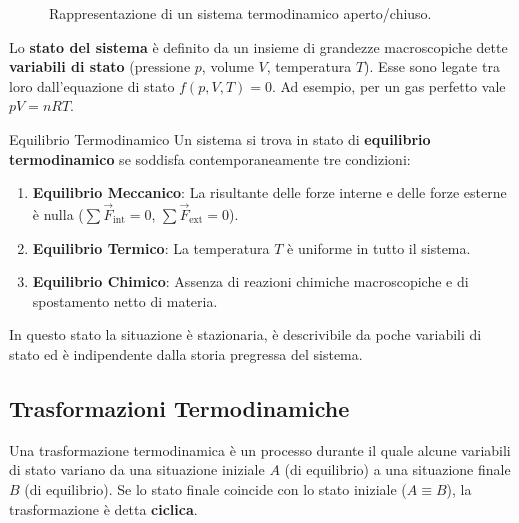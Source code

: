 \begin{figure}[ht]
\centering
{}
\caption{Rappresentazione di un sistema termodinamico aperto/chiuso.}
\end{figure}

Lo \textbf{stato del sistema} è definito da un insieme di grandezze macroscopiche dette \textbf{variabili di stato} (pressione $p$, volume $V$, temperatura $T$). Esse sono legate tra loro dall'equazione di stato $f(p, V, T) = 0$. Ad esempio, per un gas perfetto vale $p V = n R T$.

\begin{definizione}{Equilibrio Termodinamico}
Un sistema si trova in stato di \textbf{equilibrio termodinamico} se soddisfa contemporaneamente tre condizioni:
\begin{enumerate}
    \item \textbf{Equilibrio Meccanico}: La risultante delle forze interne e delle forze esterne è nulla ($\sum \vec{F}_{\text{int}} = 0$, $\sum \vec{F}_{\text{ext}} = 0$).
    \item \textbf{Equilibrio Termico}: La temperatura $T$ è uniforme in tutto il sistema.
    \item \textbf{Equilibrio Chimico}: Assenza di reazioni chimiche macroscopiche e di spostamento netto di materia.
\end{enumerate}
In questo stato la situazione è stazionaria, è descrivibile da poche variabili di stato ed è indipendente dalla storia pregressa del sistema.
\end{definizione}

\subsection{Trasformazioni Termodinamiche}
Una trasformazione termodinamica è un processo durante il quale alcune variabili di stato variano da una situazione iniziale $A$ (di equilibrio) a una situazione finale $B$ (di equilibrio).
Se lo stato finale coincide con lo stato iniziale ($A \equiv B$), la trasformazione è detta \textbf{ciclica}.


